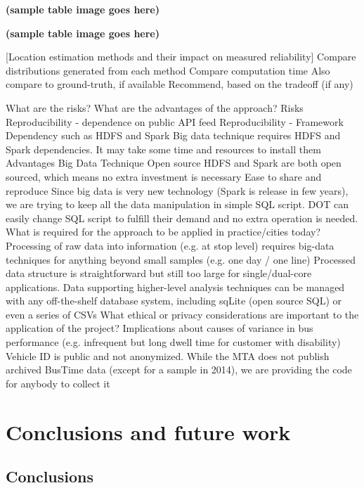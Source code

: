 \documentclass[12pt]{report}
\begin{document}
\textbf{(sample table image goes here)}

\textbf{(sample table image goes here)}


[Location estimation methods and their impact on measured reliability]
Compare distributions generated from each method
Compare computation time
Also compare to ground-truth, if available
Recommend, based on the tradeoff (if any)

What are the risks? What are the advantages of the approach?
Risks
Reproducibility - dependence on public API feed
Reproducibility - Framework Dependency such as HDFS and Spark
Big data technique requires HDFS and Spark dependencies. It may take some time and resources to install them
Advantages
Big Data Technique
Open source
HDFS and Spark are both open sourced, which means no extra investment is necessary
Ease to share and reproduce
Since big data is very new technology (Spark is release in few years), we are trying to keep all the data manipulation in simple SQL script. 
DOT can easily change SQL script to fulfill their demand and no extra operation is needed. 
What is required for the approach to be applied in practice/cities today?
Processing of raw data into information (e.g. at stop level) requires big-data techniques for anything beyond small samples (e.g. one day / one line)
Processed data structure is straightforward but still too large for single/dual-core applications.
Data supporting higher-level analysis techniques can be managed with any off-the-shelf database system, including sqLite (open source SQL) or even a series of CSVs
What ethical or privacy considerations are important to the application of the project? 
Implications about causes of variance in bus performance (e.g. infrequent but long dwell time for customer with disability)
Vehicle ID is public and not anonymized. 
While the MTA does not publish archived BusTime data (except for a sample in 2014), we are providing the code for anybody to collect it


\section{Conclusions and future work}

\subsection{Conclusions}
\end{document}
